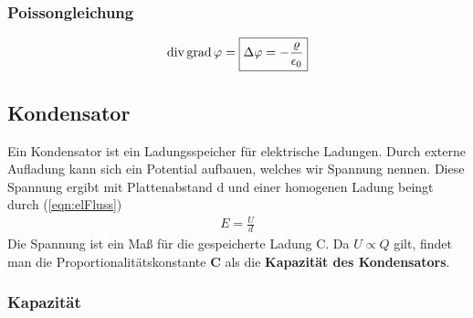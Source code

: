 \subsubsection{Poissongleichung}\begin{align}\label{eqn:Poissongleichung}
\mathrm{div\,} \mathrm{grad\,} \varphi = \boxed{\Delta \varphi = -\frac{\varrho}{\epsilon_0}}
\end{align}
\subsection{Kondensator}Ein Kondensator ist ein Ladungsspeicher für elektrische Ladungen. Durch externe Aufladung kann sich ein Potential aufbauen, welches wir Spannung nennen. Diese Spannung ergibt mit  Plattenabstand d und einer homogenen Ladung beingt durch (\ref{eqn:elFluss})\begin{align}
E = \frac{U}{d}
\end{align}Die Spannung ist ein Maß für die gespeicherte Ladung C. Da $U \propto Q$ gilt, findet man die Proportionalitätskonstante \textbf{C} als die\textbf{ Kapazität des Kondensators}.
\subsubsection{Kapazität}